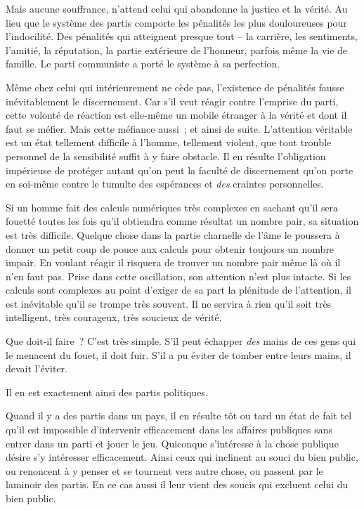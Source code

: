\documentclass[french,twoside]{book} %
\begin{document}
Mais aucune souffrance, n’attend celui qui abandonne la justice et la vérité. Au lieu que le système des partis comporte les pénalités les plus douloureuses pour l’indocilité. Des pénalités qui atteignent presque tout – la carrière, les sentiments, l’amitié, la réputation, la partie extérieure de l’honneur, parfois même la vie de famille. Le parti communiste a porté le système à sa perfection.\par
Même chez celui qui intérieurement ne cède pas, l’existence de pénalités fausse inévitablement le discernement. Car s’il veut réagir contre l’emprise du parti, cette volonté de réaction est elle-même un mobile étranger à la vérité et dont il faut se méfier. Mais cette méfiance aussi ; et ainsi de suite. L’attention véritable est un état tellement difficile à l’homme, tellement violent, que tout trouble personnel de la sensibilité suffit à y faire obstacle. Il en résulte l’obligation impérieuse de protéger autant qu’on peut la faculté de discernement qu’on porte en soi-même contre le tumulte des espérances et \emph{des} craintes personnelles.\par
Si un homme fait des calculs numériques très complexes en sachant qu’il sera fouetté toutes les fois qu’il obtiendra comme résultat un nombre pair, sa situation est très difficile. Quelque chose dans la partie charnelle de l’âme le poussera à donner un petit coup de pouce aux calculs pour obtenir toujours un nombre impair. En voulant réagir il risquera de trouver un nombre pair même là où il n’en faut pas. Prise dans cette oscillation, son attention n’est plus intacte. Si les calculs sont complexes au point d’exiger de sa part la plénitude de l’attention, il est inévitable qu’il se trompe très souvent. Il ne servira à rien qu’il soit très intelligent, très courageux, très soucieux de vérité.\par
Que doit-il faire ? C’est très simple. S’il peut échapper \emph{des} mains de ces gens qui le menacent du fouet, il doit fuir. S’il a pu éviter de tomber entre leurs mains, il devait l’éviter.\par
Il en est exactement ainsi des partis politiques.\par
Quand il y a des partis dans un pays, il en résulte tôt ou tard un état de fait tel qu’il est impossible d’intervenir efficacement dans les affaires publiques sans entrer dans un parti et jouer le jeu. Quiconque s’intéresse à la chose publique désire s’y intéresser efficacement. Ainsi ceux qui inclinent au souci du bien public, ou renoncent à y penser et se tournent vers autre chose, ou passent par le laminoir des partis. En ce cas aussi il leur vient des soucis qui excluent celui du bien public.\par
\end{document}
